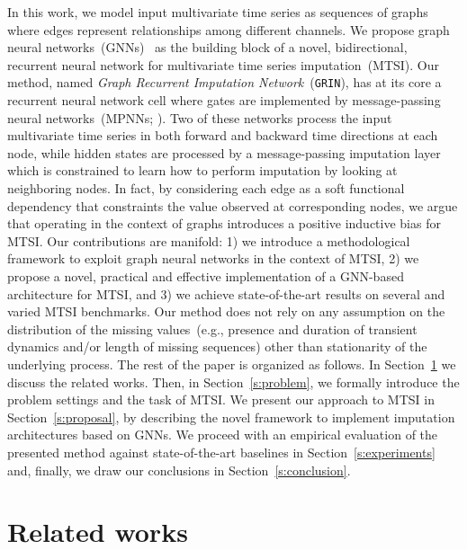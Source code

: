 \documentclass{article} \usepackage{iclr2022_conference,times}
\newcommand{\GRIL}{\texttt{GRIN}}
\begin{document}
In this work, we model input multivariate time series as sequences of graphs where edges represent relationships among different channels. We propose graph neural networks~(GNNs)~\citep{scarselli2008graph, bronstein2017geometric, battaglia2018relational} as the building block of a novel, bidirectional, recurrent neural network for multivariate time series imputation~(MTSI). Our method, named \emph{Graph Recurrent Imputation Network}~(\GRIL), has at its core a recurrent neural network cell where gates are implemented by message-passing neural networks~(MPNNs; \citealp{gilmer2017neural}). Two of these networks process the input multivariate time series in both forward and backward time directions at each node, while hidden states are processed by a message-passing imputation layer which is constrained to learn how to perform imputation by looking at neighboring nodes. In fact, by considering each edge as a soft functional dependency that constraints the value observed at corresponding nodes, we argue that operating in the context of graphs introduces a positive inductive bias for MTSI.
Our contributions are manifold: 1) we introduce a methodological framework to exploit graph neural networks in the context of MTSI, 2) we propose a novel, practical and effective implementation of a GNN-based architecture for MTSI, and 3) we achieve state-of-the-art results on several and varied MTSI benchmarks. Our method does not rely on any assumption on the distribution of the missing values~(e.g., presence and duration of transient dynamics and/or length of missing sequences) other than stationarity of the underlying process. The rest of the paper is organized as follows. In Section~\ref{s:related_works} we discuss the related works. Then, in Section~\ref{s:problem}, we formally introduce the problem settings and the task of MTSI. We present our approach to MTSI in Section~\ref{s:proposal}, by describing the novel framework to implement imputation architectures based on GNNs. We proceed with an empirical evaluation of the presented method against state-of-the-art baselines in Section~\ref{s:experiments} and, finally, we draw our conclusions in Section~\ref{s:conclusion}.

\section{Related works}\label{s:related_works}
\end{document}
